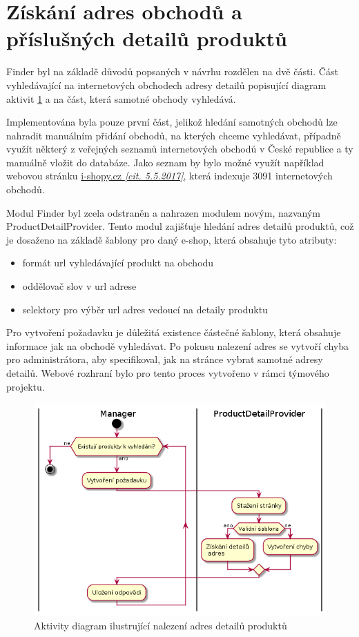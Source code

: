 \documentclass[thesis=B,czech]{FITthesis}[2012/06/26]
\begin{document}
\section{Získání adres obchodů a příslušných detailů produktů}
Finder byl na základě důvodů popsaných v návrhu rozdělen na dvě části. Část vyhledávající na internetových obchodech adresy detailů popisující diagram aktivit \ref{fig:pdp-diagram} a na část, která samotné obchody vyhledává.
\par
Implementována byla pouze první část, jelikož hledání samotných obchodů lze nahradit manuálním přidání obchodů, na kterých chceme vyhledávat, případně využít některý z veřejných seznamů internetových obchodů v České republice a ty manuálně vložit do databáze.
Jako seznam by bylo možné využít například webovou stránku \href{http://www.i-shopy.cz/}{i-shopy.cz \textit{[cit. 5.5.2017]}}, která indexuje 3091 internetových obchodů.
\par
Modul Finder byl zcela odstraněn a nahrazen modulem novým, nazvaným ProductDetailProvider.
Tento modul zajišťuje hledání adres detailů produktů, což je dosaženo na základě šablony pro daný e-shop, která obsahuje 
tyto atributy:
\begin{itemize}
\item formát url vyhledávající produkt na obchodu
\item oddělovač slov v url adrese
\item selektory pro výběr url adres vedoucí na detaily produktu
\end{itemize}
Pro vytvoření požadavku je důležitá existence částečné šablony, která obsahuje informace jak na obchodě vyhledávat.
Po pokusu nalezení adres se vytvoří chyba pro administrátora, aby specifikoval, jak na stránce vybrat samotné adresy detailů. Webové rozhraní
bylo pro tento proces vytvořeno v rámci týmového projektu.

\begin{figure}\centering
 	\includegraphics[width=1.0\textwidth]{resources/pdp-activity}
	\caption[Aktivity diagram ilustrující nalezení adres detailů produktů]{
	Aktivity diagram ilustrující nalezení adres detailů produktů}\label{fig:pdp-diagram}
\end{figure}
\end{document}
